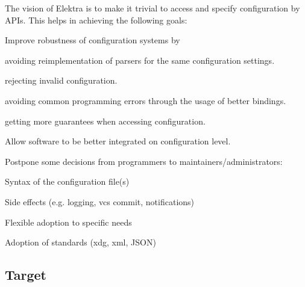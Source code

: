 The vision of Elektra is to make it trivial to access and specify configuration by A\+P\+Is. This helps in achieving the following goals\+:


\begin{DoxyItemize}
\item Improve robustness of configuration systems by
\begin{DoxyItemize}
\item avoiding reimplementation of parsers for the same configuration settings.
\item rejecting invalid configuration.
\item avoiding common programming errors through the usage of better bindings.
\item getting more guarantees when accessing configuration.
\end{DoxyItemize}
\item Allow software to be better integrated on configuration level.
\item Postpone some decisions from programmers to maintainers/administrators\+:
\begin{DoxyItemize}
\item Syntax of the configuration file(s)
\item Side effects (e.\+g. logging, vcs commit, notifications)
\item Flexible adoption to specific needs
\item Adoption of standards (xdg, xml, J\+S\+ON)
\end{DoxyItemize}
\end{DoxyItemize}

\subsection*{Target}



